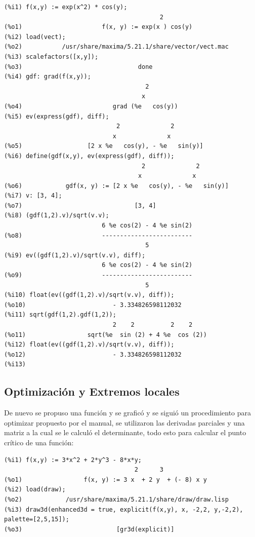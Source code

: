 \documentclass[12pt,letterpaper]{article}
\begin{document}
\begin{verbatim}
(%i1) f(x,y) := exp(x^2) * cos(y);
                                           2
(%o1)                      f(x, y) := exp(x ) cos(y)
(%i2) load(vect);
(%o2)           /usr/share/maxima/5.21.1/share/vector/vect.mac
(%i3) scalefactors([x,y]);
(%o3)                                done
(%i4) gdf: grad(f(x,y));
                                       2
                                      x
(%o4)                         grad (%e   cos(y))
(%i5) ev(express(gdf), diff);
                               2              2
                              x              x
(%o5)                  [2 x %e   cos(y), - %e   sin(y)]
(%i6) define(gdf(x,y), ev(express(gdf), diff));
                                      2              2
                                     x              x
(%o6)            gdf(x, y) := [2 x %e   cos(y), - %e   sin(y)]
(%i7) v: [3, 4];
(%o7)                               [3, 4]
(%i8) (gdf(1,2).v)/sqrt(v.v);
                           6 %e cos(2) - 4 %e sin(2)
(%o8)                      -------------------------
                                       5
(%i9) ev((gdf(1,2).v)/sqrt(v.v), diff);
                           6 %e cos(2) - 4 %e sin(2)
(%o9)                      -------------------------
                                       5
(%i10) float(ev((gdf(1,2).v)/sqrt(v.v), diff));
(%o10)                        - 3.334826598112032
(%i11) sqrt(gdf(1,2).gdf(1,2));
                              2    2          2    2
(%o11)                 sqrt(%e  sin (2) + 4 %e  cos (2))
(%i12) float(ev((gdf(1,2).v)/sqrt(v.v), diff));
(%o12)                        - 3.334826598112032
(%i13) 
\end{verbatim}

\subsection{Optimización y Extremos locales}
De nuevo se propuso una función y se graficó y se siguió un procedimiento para optimizar propuesto por el manual, se utilizaron las derivadas parciales y una matriz a la cual se le calculó el determinante, todo esto para calcular el punto crítico de una función:

\begin{verbatim}
(%i1) f(x,y) := 3*x^2 + 2*y^3 - 8*x*y;
                                    2      3
(%o1)                 f(x, y) := 3 x  + 2 y  + (- 8) x y
(%i2) load(draw);
(%o2)            /usr/share/maxima/5.21.1/share/draw/draw.lisp
(%i3) draw3d(enhanced3d = true, explicit(f(x,y), x, -2,2, y,-2,2), palette=[2,5,15]);
(%o3)                          [gr3d(explicit)]
\end{verbatim}
\end{document}
